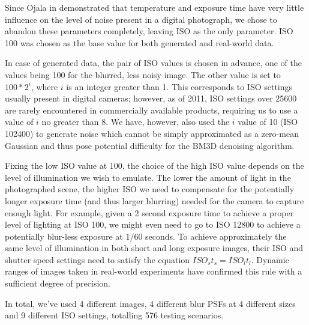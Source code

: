 \documentclass[12pt,notitlepage]{report}
\begin{document}
Since Ojala in \cite{ojal08} demonstrated that temperature and exposure time have very little influence on the level of noise present in a digital photograph, we chose to abandon these parameters completely, leaving ISO as the only parameter. ISO 100 was chosen as the base value for both generated and real-world data. 

In case of generated data, the pair of ISO values is chosen in advance, one of the values being 100 for the blurred, less noisy image. The other value is set to $100*2^i$, where $i$ is an integer greater than 1. This corresponds to ISO settings usually present in digital cameras; however, as of 2011, ISO settings over 25600 are rarely encountered in commercially available products, requiring us to use a value of $i$ no greater than 8. We have, however, also used the $i$ value of 10 (ISO 102400) to generate noise which cannot be simply approximated as a zero-mean Gaussian and thus pose potential difficulty for the BM3D denoising algorithm.  

Fixing the low ISO value at 100, the choice of the high ISO value depends on the level of illumination we wish to emulate. The lower the amount of light in the photographed scene, the higher ISO we need to compensate for the potentially longer exposure time (and thus larger blurring) needed for the camera to capture enough light. For example, given a 2 second exposure time to achieve a proper level of lighting at ISO 100, we might even need to go to ISO 12800 to achieve a potentially blur-less exposure at $1/60$ seconds. To achieve approximately the same level of illumination in both short and long exposure images, their ISO and shutter speed settings need to satisfy the equation $ISO_s t_s = ISO_l t_l$. Dynamic ranges of images taken in real-world experiments have confirmed this rule with a sufficient degree of precision.  

In total, we've used 4 different images, 4 different blur PSFs at 4 different sizes and 9 different ISO settings, totalling 576 testing scenarios. 
\end{document}
